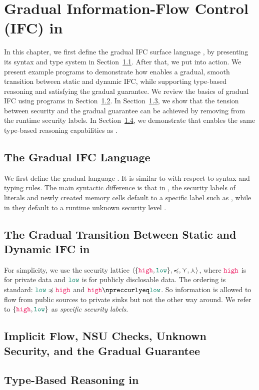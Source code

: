 \chapter{Gradual Information-Flow Control (IFC) in \Surface}
\label{ch:examples}

In this chapter, we first define the gradual IFC surface language \Surface, by
presenting its syntax and type system in Section~\ref{sec:surface-def}. After
that, we put \Surface into action. We present example programs to demonstrate
how \Surface enables a gradual, smooth transition between static and dynamic
IFC, while supporting type-based reasoning and satisfying the gradual guarantee.
We review the basics of gradual IFC using \Surface programs in
Section~\ref{sec:example1}. In Section~\ref{sec:example2}, we show that the
tension between security and the gradual guarantee can be achieved by removing
\unk from the runtime security labels. In Section~\ref{sec:example3}, we
demonstrate that \Surface enables the same type-based reasoning capabilities as
\GSLRef.

\section{The Gradual IFC Language \Surface}
\label{sec:surface-def}

We first define the gradual language \Surface. It is similar to \GSLRef with
respect to syntax and typing rules. The main syntactic difference is that in
\Surface, the security labels of literals and newly created memory cells default
to a specific label such as \low, while in \GSLRef they default to a runtime
unknown security level \unk.

\section{The Gradual Transition Between Static and Dynamic IFC in \Surface}
\label{sec:example1}

For simplicity, we use the security lattice $\langle \{\high, \low\}
, \preccurlyeq, \curlyvee , \curlywedge \rangle$, where $\high$ is for
private data and $\low$ is for publicly disclosable data. The ordering
is standard: $\low \preccurlyeq \high$ and
$\high \npreccurlyeq \low$. So information is allowed to flow from
public sources to private sinks but not the other way around.
We refer to $\{\high,\low\}$ as \emph{specific security labels}.

\section{Implicit Flow, NSU Checks, Unknown Security, and the Gradual Guarantee}
\label{sec:example2}

\section{Type-Based Reasoning in \Surface}
\label{sec:example3}
